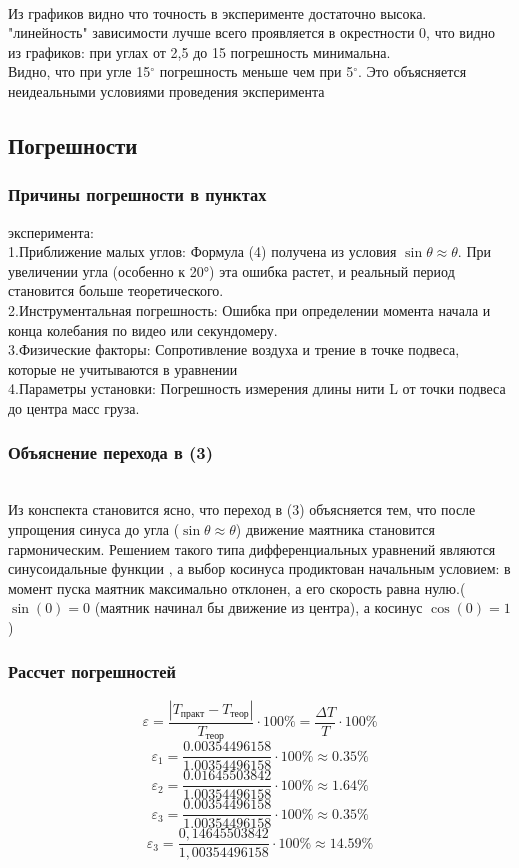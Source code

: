 \vspace{0.5cm}
\\ Из графиков видно что точность в эксперименте достаточно высока.
\\ "линейность" зависимости лучше всего проявляется в окрестности 0, что видно из графиков: при углах от 2,5 до 15 погрешность минимальна.
\\ Видно, что при угле 15$^\circ$ погрешность меньше чем при 5$^\circ$. Это объясняется неидеальными условиями проведения эксперимента

\newpage
\subsection{Погрешности}
\subsubsection{ Причины погрешности в пунктах }эксперимента:
\\1.Приближение малых углов: Формула (4) получена из условия $\sin \theta \approx \theta$. При увеличении угла (особенно к 20°) эта ошибка растет, и реальный период становится больше теоретического.
\\2.Инструментальная погрешность: Ошибка при определении момента начала и конца колебания по видео или секундомеру.
\\3.Физические факторы: Сопротивление воздуха и трение в точке подвеса, которые не учитываются в уравнении 
\\4.Параметры установки: Погрешность измерения длины нити L от точки подвеса до центра масс груза.

\vspace{0.5cm}
\subsubsection{Объяснение перехода в (3)}
\\ Из конспекта становится ясно, что
переход в (3) объясняется тем, что после упрощения синуса до угла ($\sin \theta \approx \theta$) движение маятника становится гармоническим. Решением такого типа дифференциальных уравнений являются синусоидальные функции \cite{1}, а выбор косинуса продиктован начальным условием: в момент пуска маятник максимально отклонен, а его скорость равна нулю.($\sin(0) = 0$ (маятник начинал бы движение из центра), а косинус $\cos(0) = 1$)

\subsubsection{Рассчет погрешностей}
\[
\varepsilon = \frac{|T_{\text{практ}} - T_{\text{теор}}|}{T_{\text{теор}}} \cdot 100\% = \frac{\Delta T}{T}\cdot 100\%\]
\[
\varepsilon_1 = \frac{0.00354496158}{1.00354496158} \cdot 100\% \approx 0.35\% 
\]
\[
\varepsilon_2 = \frac{0.01645503842}{1.00354496158} \cdot 100\% \approx 1.64\% 
\]
\[
\varepsilon_3 = \frac{0.00354496158}{1.00354496158} \cdot 100\% \approx 0.35\% 
\]
\[
\varepsilon_3 = \frac{0,14645503842}{1,00354496158} \cdot 100\% \approx 14.59\% 
\]

